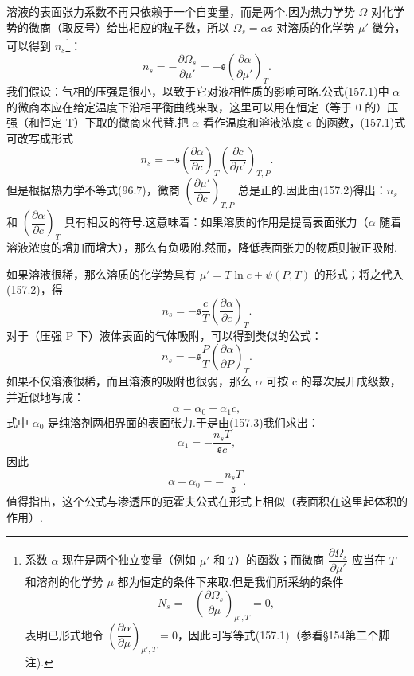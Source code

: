 溶液的表面张力系数不再只依赖于一个自变量，而是两个.因为热力学势 $\Omega$ 对化学势的微商（取反号）给出相应的粒子数，所以 $\Omega_s=\alpha\mathfrak{s}$ 对溶质的化学势 $\mu'$ 微分，可以得到 $n_s$\footnote{系数 $\alpha$ 现在是两个独立变量（例如 $\mu'$ 和 $T$）的函数；而微商 $\dfrac{\partial\Omega_s}{\partial\mu'}$ 应当在 $T$ 和溶剂的化学势 $\mu$ 都为恒定的条件下来取.但是我们所采纳的条件
\begin{equation*}
  N_s=-\left(\frac{\partial\Omega_s}{\partial\mu}\right)_{\mu',T}=0,
\end{equation*}
表明已形式地令 $\left(\dfrac{\partial\alpha}{\partial\mu}\right)_{\mu',T}=0$，因此可写等式(157.1)（参看§154第二个脚注).}：
\begin{equation}
  n_s=-\frac{\partial\Omega_s}{\partial\mu'}
  =-\mathfrak{s}\left(\frac{\partial\alpha}{\partial\mu'}\right)_T.
\end{equation}
我们假设：气相的压强是很小，以致于它对液相性质的影响可略.公式(157.1)中 $\alpha$ 的微商本应在给定温度下沿相平衡曲线来取，这里可以用在恒定（等于 0 的）压强（和恒定 T）下取的微商来代替.把 $\alpha$ 看作温度和溶液浓度 c 的函数，(157.1)式可改写成形式
\begin{equation}
  n_s=-\mathfrak{s}\left(\frac{\partial\alpha}{\partial c}\right)_T
  \left(\frac{\partial c}{\partial\mu'}\right)_{T,P}.
\end{equation}
但是根据热力学不等式(96.7)，微商 $\left(\dfrac{\partial\mu'}{\partial c}\right)_{T,P}$ 总是正的.因此由(157.2)得出：$n_s$ 和 $\left(\dfrac{\partial\alpha}{\partial c}\right)_T$ 具有相反的符号.这意味着：如果溶质的作用是提高表面张力（$\alpha$ 随着溶液浓度的增加而增大），那么有负吸附.然而，降低表面张力的物质则被正吸附.

如果溶液很稀，那么溶质的化学势具有 $\mu'=T\ln c+\psi(P,T)$ 的形式；将之代入(157.2)，得
\begin{equation}
  n_s=-\mathfrak{s}\frac{c}{T}\left(\frac{\partial\alpha}{\partial c}\right)_T.
\end{equation}
对于（压强 P 下）液体表面的气体吸附，可以得到类似的公式：
\begin{equation}
  n_s=-\mathfrak{s}\frac{P}{T}\left(\frac{\partial\alpha}{\partial P}\right)_T.
\end{equation}
如果不仅溶液很稀，而且溶液的吸附也很弱，那么 $\alpha$ 可按 c 的幂次展开成级数，并近似地写成：
\begin{equation*}
  \alpha=\alpha_0+\alpha_1 c,
\end{equation*}
式中 $\alpha_0$ 是纯溶剂两相界面的表面张力.于是由(157.3)我们求出：
\begin{equation*}
  \alpha_1=-\frac{n_s T}{\mathfrak{s}c},
\end{equation*}
因此
\begin{equation}
  \alpha-\alpha_0=-\frac{n_s T}{\mathfrak{s}}.
\end{equation}
值得指出，这个公式与渗透压的范霍夫公式在形式上相似（表面积在这里起体积的作用）.

